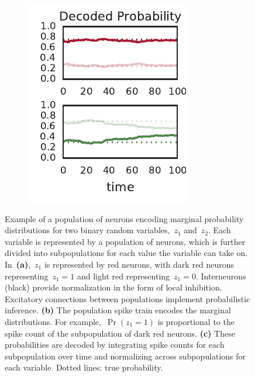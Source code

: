 \begin{figure}[t!]
\begin{subfigure}[b]{1.8in}
    \includegraphics[width=\textwidth]{figures/ch7/example_prs}
    \label{fig:representation_prs}
  \end{subfigure}
  \vspace{-.25in}
  \caption[Example of a population of neurons encoding a probability
    distribution] {Example of a population of neurons encoding marginal
    probability distributions for two binary random variables,~$z_1$
    and~$z_2$. Each variable is represented by a population of neurons,
    which is further divided into subpopulations for each value the variable
    can take on. In~\textbf{(a)},~$z_1$ is represented by red neurons, with
    dark red neurons representing~${z_1=1}$ and light red representing~${z_1=0}$.
    Interneurons (black) provide normalization in the form of local inhibition.
    Excitatory connections between populations implement probabilistic inference.
    \textbf{(b)} The population spike train encodes the marginal distributions.
    For example,~${\Pr(z_1=1)}$ is proportional to the spike count of the subpopulation
    of dark red neurons.
    \textbf{(c)} These probabilities are decoded by integrating
    spike counts for each subpopulation over time and normalizing across
    subpopulations for each variable. Dotted lines: true probability. 
  }
 \label{fig:representation}
\end{figure}



